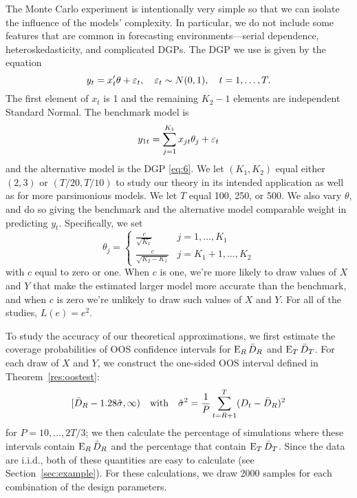 \documentclass[12pt,draft]{article}
\begin{document}
The Monte Carlo experiment is intentionally very simple so that we can
isolate the influence of the models' complexity.  In particular, we do
not include some features that are common in forecasting
environments---serial dependence, heteroskedasticity, and complicated
DGPs. The DGP we use is given by the equation
\begin{equation}\label{eq:6}
  y_t = x_t'\theta + \varepsilon_t,\quad \varepsilon_t \sim N(0,1),
  \quad t=1,\dots,T.
\end{equation}
The first element of $x_t$ is 1 and the remaining $K_2-1$ elements are
independent Standard Normal.  The benchmark model is
\begin{equation}
  \label{eq:1}
  y_{1t} = \sum_{j=1}^{K_1} x_{jt}\theta_j + \varepsilon_t
\end{equation}
and the alternative model is the DGP \eqref{eq:6}.  We let
$(K_1,K_2)$ equal either $(2,3)$ or $(T/20,T/10)$ to study our theory
in its intended application as well as for more parsimonious models.
We let $T$ equal 100, 250, or 500.  We also vary $\theta$, and do
so giving the benchmark and the alternative model comparable weight in
predicting $y_t$.  Specifically, we set
\begin{equation*}
  \theta_j =
\begin{cases} \frac{c}{\sqrt{K_1}} & j = 1,\dots,K_1 \\
\frac{c}{\sqrt{K_2 - K_1}} & j = K_1 + 1,\dots,K_2 \end{cases}
\end{equation*}
with $c$ equal to zero or one.  When $c$ is one, we're more likely to
draw values of $X$ and $Y$ that make the estimated larger model more
accurate than the benchmark, and when $c$ is zero we're unlikely to
draw such values of $X$ and $Y$.  For all of the studies, $L(e) =
e^2$.

To study the accuracy of our theoretical approximations, we first
estimate the coverage probabilities of OOS confidence intervals for
$\operatorname{E}_R \bar{D}_{R}$ and $\operatorname{E}_T \bar{D}_{T}$. For each draw of $X$ and $Y$, we
construct the one-sided OOS interval defined in
Theorem~\ref{res:oostest}:
\begin{equation*}
  [ \bar{D}_{R} - 1.28 \hat{\sigma}, \infty) \quad\text{with}\quad
  \hat{\sigma}^2 = \frac1P \sum_{t=R+1}^T (D_t - \bar{D}_{R})^{2}
\end{equation*}
for $P = 10,\dots,2T/3$; we then calculate the percentage of
simulations where these intervals contain $\operatorname{E}_R \bar{D}_{R}$ and the
percentage that contain $\operatorname{E}_T \bar{D}_{T}$.  Since the data are i.i.d., both
of these quantities are easy to calculate (see
Section~\ref{sec:example}). For these calculations, we draw 2000
samples for each combination of the design parameters.
\end{document}

